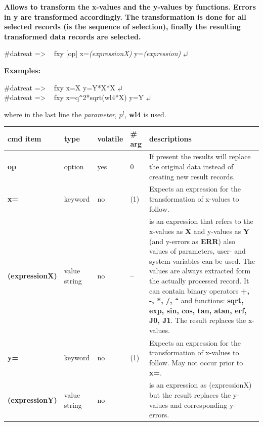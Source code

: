 \documentclass[11pt,fleqn]{book} %
\newcommand{\linespace}{\vspace{4ex}}
\newcommand{\return}{$\carriagereturn$} %
\newcommand{\sysprompt}{{\color{green}...\textgreater} ~ }
\newcommand{\dtrprompt}{{\color{blue}\#datreat =\textgreater} ~ }
\newcommand{\enter}[1]{{\color{red} \bf #1}}
\begin{document}
\begin{exercise}
\bf
Allows to transform the x-values and the y-values by functions. Errors in y are transformed accordingly.
The transformation is done for all selected records (is the sequence of selection), finally the resulting
transformed data records are selected.
\end{exercise}

\begin{corollary}
\dtrprompt fxy [op] x=\emph{(expressionX)}  y=\emph{(expression)}   \return 
\end{corollary}


\linespace
{\bf Examples:}
\begin{corollary}
\dtrprompt fxy x=X y=Y*X*X               \return \\
\dtrprompt fxy x=q\Verb!^!2*sqrt(wl4*X) y=Y \return 
\end{corollary}

where in the last line the \emph{parameter}, ${p^l}$, {\bf wl4} is used.

\newpage

\begin{tabular}{ | l | l | l | l | p{7cm} |}


\hline
  cmd item  &
  type      & 
  volatile  & 
  \# arg    & 
  descriptions \\ 
\hline\hline %
  {\bf op}  &
  option    & 
  yes       & 
  0         & 
  If present the results will replace the original data instead of creating new result records. \\ 
\hline
  {\bf x=}  &
  keyword   & 
  no        & 
  (1)       & 
  Expects an expression for the transformation of x-values to follow. \\ 
 \hline
  {\bf (expressionX)}  &
  value string         & 
  no                   & 
  --                   & 
  is an expression that refers to the x-values as {\bf X} and y-values as {\bf Y} (and  
  y-errors as {\bf ERR}) also values of parameters, user- and system-variables can be used.
  The values are always extracted form the actually processed record.
  It can contain binary operators {\bf  +, -, *, /, \Verb!^! } and functions: 
  {\bf {sqrt, exp, sin, cos, tan, atan, erf, J0, J1}}. The result replaces the x-values. \\ 
  \hline
  {\bf y=}            &
  keyword             & 
  no                  & 
  (1)                 &  
  Expects an expression for the transformation of x-values to follow. May not occur prior to {\bf x=}.\\ 
 \hline
  {\bf (expressionY)}  &
  value string         & 
  no                   & 
  --                   & 
  is an expression as (expressionX) but the result replaces the y-values and corresponding
  y-errors.\\
\hline
\end{tabular}
\noindent
\end{document}
